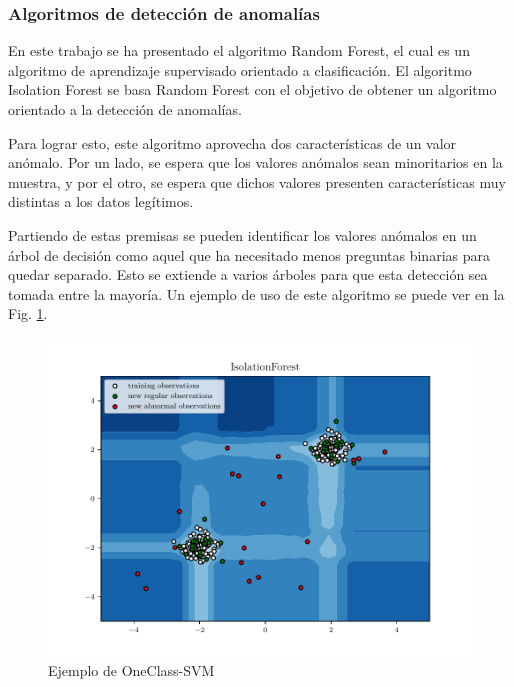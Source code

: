 \subsubsection{Algoritmos de detección de anomalías}


En este trabajo se ha presentado el algoritmo Random Forest, el cual es un algoritmo de aprendizaje supervisado orientado a clasificación. El algoritmo Isolation Forest \cite{liu2008isolation} \cite{cheng2019outlier} se basa Random Forest con el objetivo de obtener un algoritmo orientado a la detección de anomalías.

Para lograr esto, este algoritmo aprovecha dos características de un valor anómalo. Por un lado, se espera que los valores anómalos sean minoritarios en la muestra, y por el otro, se espera que dichos valores presenten características muy distintas a los datos legítimos.

Partiendo de estas premisas se pueden identificar los valores anómalos en un árbol de decisión como aquel que ha necesitado menos preguntas binarias para quedar separado. Esto se extiende a varios árboles para que esta detección sea tomada entre la mayoría. Un ejemplo de uso de este algoritmo se puede ver en la Fig. \ref{fig:ex_scikit_isolation}.

\begin{figure}[htpb!]
    \centering
    \includegraphics[scale=0.7]{images/isolation_example.pdf}
    \caption{Ejemplo de OneClass-SVM \cite{ex_scikit_isolation}}
    \label{fig:ex_scikit_isolation}
\end{figure}

